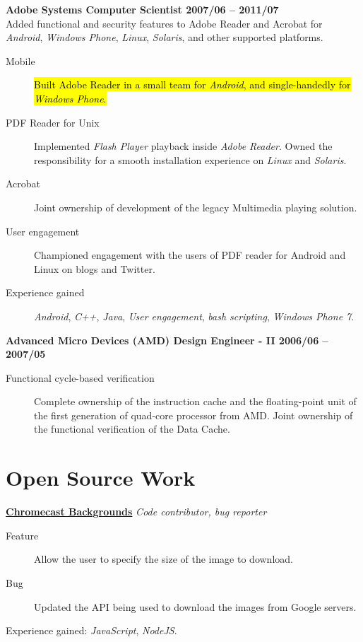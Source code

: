 \documentclass[margin,line]{resume}
\begin{document}
\begin{resume}
\textbf{Adobe Systems \hfill Computer Scientist \hfill 2007/06 -- 2011/07}\\
Added functional and security features to Adobe Reader and Acrobat for \textit{Android}, \textit{Windows Phone}, \textit{Linux}, \textit{Solaris}, and other supported platforms.
\begin{description}
\item [Mobile] \hl{Built Adobe Reader in a small team for \textit{Android}, and single-handedly for \textit{Windows Phone}.}
\item [PDF Reader for Unix] Implemented \textit{Flash Player} playback inside \textit{Adobe Reader}. Owned the responsibility for a smooth installation experience on \textit{Linux} and \textit{Solaris}.
\item [Acrobat] Joint ownership of development of the legacy Multimedia playing solution.
\item [User engagement] Championed engagement with the users of PDF reader for Android and Linux on blogs and Twitter.
\item [Experience gained] \textit{Android}, \textit{C++}, \textit{Java}, \textit{User engagement}, \textit{bash scripting}, \textit{Windows Phone 7}.
  \end{description}
\hrulefill

\textbf{Advanced Micro Devices (AMD) \hfill Design Engineer - II \hfill 2006/06 -- 2007/05}
\begin{description}
\item [Functional cycle-based verification] Complete ownership of the instruction cache and the floating-point unit of the first generation of quad-core processor from AMD. Joint ownership of the functional verification of the Data Cache.
  \end{description}
\vfill \break

\section{Open Source Work}

\textbf{\href{https://github.com/aawc/Chromecast-Backgrounds}{Chromecast Backgrounds}} \hfill \textsl{Code contributor, bug reporter}\\
\begin{description}
  \item[Feature] Allow the user to specify the size of the image to download.
  \item[Bug] Updated the API being used to download the images from Google servers.
  \end{description}
Experience gained: \textit{JavaScript}, \textit{NodeJS}.


\end{resume}
\end{document}

